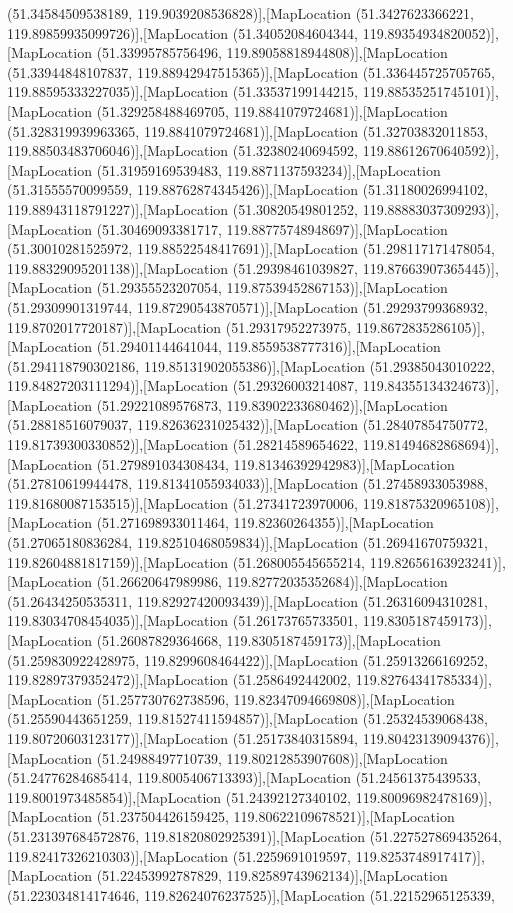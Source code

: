 (51.34584509538189, 119.9039208536828)],[MapLocation (51.3427623366221, 119.89859935099726)],[MapLocation (51.34052084604344, 119.89354934820052)],[MapLocation (51.33995785756496, 119.89058818944808)],[MapLocation (51.33944848107837, 119.88942947515365)],[MapLocation (51.336445725705765, 119.88595333227035)],[MapLocation (51.33537199144215, 119.88535251745101)],[MapLocation (51.329258488469705, 119.8841079724681)],[MapLocation (51.328319939963365, 119.8841079724681)],[MapLocation (51.32703832011853, 119.88503483706046)],[MapLocation (51.32380240694592, 119.88612670640592)],[MapLocation (51.31959169539483, 119.8871137593234)],[MapLocation (51.31555570099559, 119.88762874345426)],[MapLocation (51.31180026994102, 119.88943118791227)],[MapLocation (51.30820549801252, 119.88883037309293)],[MapLocation (51.30469093381717, 119.88775748948697)],[MapLocation (51.30010281525972, 119.88522548417691)],[MapLocation (51.298117171478054, 119.88329095201138)],[MapLocation (51.29398461039827, 119.87663907365445)],[MapLocation (51.29355523207054, 119.87539452867153)],[MapLocation (51.29309901319744, 119.87290543870571)],[MapLocation (51.29293799368932, 119.8702017720187)],[MapLocation (51.29317952273975, 119.8672835286105)],[MapLocation (51.29401144641044, 119.8559538777316)],[MapLocation (51.294118790302186, 119.85131902055386)],[MapLocation (51.29385043010222, 119.84827203111294)],[MapLocation (51.29326003214087, 119.84355134324673)],[MapLocation (51.29221089576873, 119.83902233680462)],[MapLocation (51.28818516079037, 119.82636231025432)],[MapLocation (51.28407854750772, 119.81739300330852)],[MapLocation (51.28214589654622, 119.81494682868694)],[MapLocation (51.279891034308434, 119.81346392942983)],[MapLocation (51.27810619944478, 119.81341055934033)],[MapLocation (51.27458933053988, 119.81680087153515)],[MapLocation (51.27341723970006, 119.81875320965108)],[MapLocation (51.271698933011464, 119.82360264355)],[MapLocation (51.27065180836284, 119.82510468059834)],[MapLocation (51.26941670759321, 119.82604881817159)],[MapLocation (51.268005545655214, 119.82656163923241)],[MapLocation (51.26620647989986, 119.82772035352684)],[MapLocation (51.26434250535311, 119.82927420093439)],[MapLocation (51.26316094310281, 119.83034708454035)],[MapLocation (51.26173765733501, 119.8305187459173)],[MapLocation (51.26087829364668, 119.8305187459173)],[MapLocation (51.259830922428975, 119.8299608464422)],[MapLocation (51.25913266169252, 119.82897379352472)],[MapLocation (51.2586492442002, 119.82764341785334)],[MapLocation (51.257730762738596, 119.82347094669808)],[MapLocation (51.25590443651259, 119.81527411594857)],[MapLocation (51.25324539068438, 119.80720603123177)],[MapLocation (51.25173840315894, 119.80423139094376)],[MapLocation (51.24988497710739, 119.80212853907608)],[MapLocation (51.24776284685414, 119.8005406713393)],[MapLocation (51.24561375439533, 119.8001973485854)],[MapLocation (51.24392127340102, 119.80096982478169)],[MapLocation (51.237504426159425, 119.80622109678521)],[MapLocation (51.231397684572876, 119.81820802925391)],[MapLocation (51.227527869435264, 119.82417326210303)],[MapLocation (51.2259691019597, 119.8253748917417)],[MapLocation (51.22453992787829, 119.82589743962134)],[MapLocation (51.223034814174646, 119.82624076237525)],[MapLocation (51.22152965125339, 